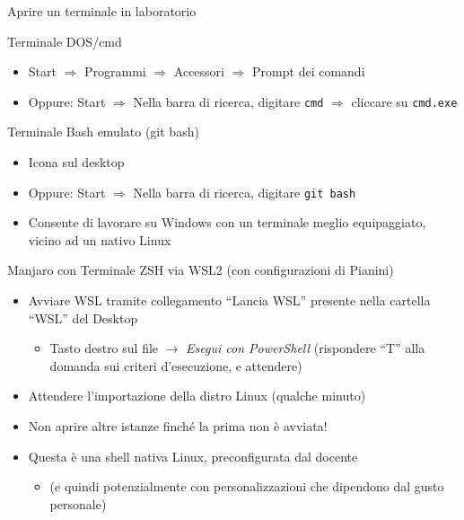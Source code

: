\documentclass[xcolor=dvipsnames,presentation]{beamer}
\begin{document}
\begin{frame}{Aprire un terminale in laboratorio}
    \begin{block}{Terminale DOS/cmd}
        \begin{itemize}
            \item Start $\Rightarrow$ Programmi $\Rightarrow$ Accessori $\Rightarrow$ Prompt dei comandi
            \item Oppure: Start  $\Rightarrow$ Nella barra di ricerca, digitare \texttt{cmd} $\Rightarrow$ cliccare su \texttt{cmd.exe}
        \end{itemize}
    \end{block}
    \begin{block}{Terminale Bash emulato (git bash)}
        \begin{itemize}
            \item Icona sul desktop
            \item Oppure: Start  $\Rightarrow$ Nella barra di ricerca, digitare \texttt{git bash}
            \item Consente di lavorare su Windows con un terminale meglio equipaggiato, vicino ad un nativo Linux
        \end{itemize}
    \end{block}
    \begin{block}{Manjaro con Terminale ZSH via WSL2 (con configurazioni di Pianini)}
        \begin{itemize}
            \item Avviare WSL tramite collegamento ``Lancia WSL'' presente nella cartella ``WSL'' del Desktop
            	\begin{itemize}
            	\item Tasto destro sul file $\to$ \emph{Esegui con PowerShell} (rispondere ``T'' alla domanda sui criteri d'esecuzione, e attendere)
            	\end{itemize}
            \item Attendere l'importazione della distro Linux (qualche minuto)
            \item Non aprire altre istanze finché la prima non è avviata!
            \item Questa è una shell nativa Linux, preconfigurata dal docente
            \begin{itemize}
                \item (e quindi potenzialmente con personalizzazioni che dipendono dal gusto personale)
            \end{itemize}
        \end{itemize}
    \end{block}
\end{frame}
\end{document}

